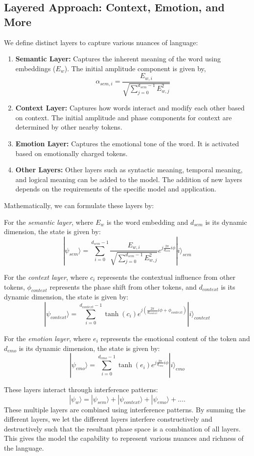 \documentclass[11pt, a4paper]{article}
\begin{document}
\subsection{Layered Approach: Context, Emotion, and More}

We define distinct layers to capture various nuances of language:
\begin{enumerate}
    \item \textbf{Semantic Layer:} Captures the inherent meaning of the word using embeddings ($E_w$). The initial amplitude component is given by,
        $$
        \alpha_{sem,i} = \frac{E_{w,i}}{\sqrt{\sum_{j=0}^{d_{sem}-1} E_{w,j}^2}}
        $$
    \item \textbf{Context Layer:} Captures how words interact and modify each other based on context. The initial amplitude and phase components for context are determined by other nearby tokens.
    \item \textbf{Emotion Layer:} Captures the emotional tone of the word. It is activated based on emotionally charged tokens.
    \item \textbf{Other Layers:} Other layers such as syntactic meaning, temporal meaning, and logical meaning can be added to the model. The addition of new layers depends on the requirements of the specific model and application.
\end{enumerate}

Mathematically, we can formulate these layers by:

For the \textit{semantic layer}, where $E_w$ is the word embedding and $d_{sem}$ is its dynamic dimension, the state is given by:
$$
|\psi_{sem}\rangle = \sum_{i=0}^{d_{sem}-1} \frac{E_{w,i}}{\sqrt{\sum_{j=0}^{d_{sem}-1} E_{w,j}^2}}  e^{j \frac{2\pi}{d_{sem}} i \phi} |i\rangle_{sem}
$$

For the \textit{context layer}, where $c_i$ represents the contextual influence from other tokens, $\phi_{context}$ represents the phase shift from other tokens, and $d_{context}$ is its dynamic dimension, the state is given by:
$$
|\psi_{context}\rangle = \sum_{i=0}^{d_{context}-1} \tanh(c_i)  e^{j (\frac{2\pi}{d_{context}} i \phi + \phi_{context})} |i\rangle_{context}
$$

For the \textit{emotion layer}, where $e_i$ represents the emotional content of the token and $d_{emo}$ is its dynamic dimension, the state is given by:
$$
|\psi_{emo}\rangle = \sum_{i=0}^{d_{emo}-1} \tanh(e_i)  e^{j \frac{2\pi}{d_{emo}} i \phi} |i\rangle_{emo}
$$

These layers interact through interference patterns:
$$
|\psi_{w}\rangle = |\psi_{sem}\rangle + |\psi_{context}\rangle + |\psi_{emo}\rangle + ....
$$
These multiple layers are combined using interference patterns. By summing the different layers, we let the different layers interfere constructively and destructively such that the resultant phase space is a combination of all layers. This gives the model the capability to represent various nuances and richness of the language.
\end{document}
